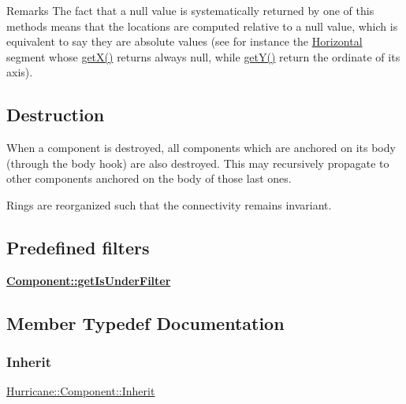 \begin{DoxyRemark}{Remarks}
The fact that a null value is systematically returned by one of this methods means that the locations are computed relative to a null value, which is equivalent to say they are absolute values (see for instance the \mbox{\hyperlink{classHurricane_1_1Horizontal}{Horizontal}} segment whose \mbox{\hyperlink{classHurricane_1_1Component_a0f8299ed73705fd4fbf56589dcc7e074}{get\+X()}} returns always null, while \mbox{\hyperlink{classHurricane_1_1Component_a727da3f127c3a7a0a09468219f98c3e6}{get\+Y()}} return the ordinate of its axis).
\end{DoxyRemark}
\hypertarget{classHurricane_1_1Component_secComponentDestruction}{}\subsection{Destruction}\label{classHurricane_1_1Component_secComponentDestruction}
When a component is destroyed, all components which are anchored on its body (through the body hook) are also destroyed. This may recursively propagate to other components anchored on the body of those last ones.

Rings are reorganized such that the connectivity remains invariant.\hypertarget{classHurricane_1_1Component_secComponentPredefinedFilters}{}\subsection{Predefined filters}\label{classHurricane_1_1Component_secComponentPredefinedFilters}
{\bfseries \mbox{\hyperlink{classHurricane_1_1Component_a8680f2756892366db8642bfcfd7ce097}{Component\+::get\+Is\+Under\+Filter}}} 

\subsection{Member Typedef Documentation}
\mbox{\label{classHurricane_1_1Component_a3911e94f9d220eb809d349b1181034e3}} 
\subsubsection{\texorpdfstring{Inherit}{Inherit}}
{\footnotesize\ttfamily \mbox{\hyperlink{classHurricane_1_1Component_a3911e94f9d220eb809d349b1181034e3}{Hurricane\+::\+Component\+::\+Inherit}}}

